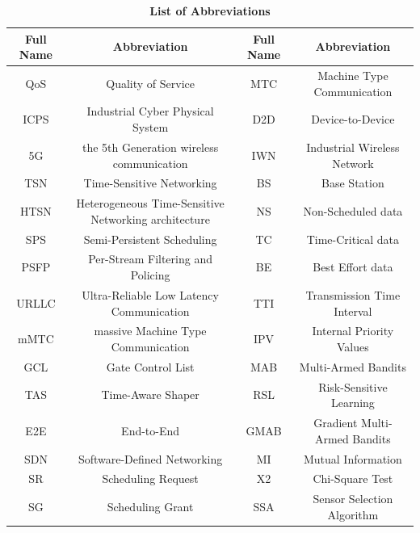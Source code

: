 \documentclass{SCIS2021}
\begin{document}
	\begin{table}[htbp]
		\footnotesize
		\captionsetup{labelformat=empty}
		\caption{{\color{blue}\textbf{List of Abbreviations}}}
		\label{tal:abbreviation}
		\label{tab0}
		\tabcolsep 8pt %
		\begin{tabular*}{\textwidth}{c|c|c|c}
			\toprule
			{\color{blue}\textbf{Full Name}} & {\color{blue}\textbf{Abbreviation}} & {\color{blue}\textbf{Full Name}} & {\color{blue}\textbf{Abbreviation}} \\\hline
			{\color{blue}QoS} & {\color{blue}Quality of Service} & {\color{blue}MTC} & {\color{blue}Machine Type Communication} \\
			{\color{blue}ICPS} & {\color{blue}Industrial Cyber Physical System} & {\color{blue}D2D} & {\color{blue}Device-to-Device} \\
			{\color{blue}5G} & {\color{blue}the 5th Generation wireless communication} & {\color{blue}IWN} & {\color{blue}Industrial Wireless Network}\\
			{\color{blue}TSN} & {\color{blue}Time-Sensitive Networking} & {\color{blue}BS} & {\color{blue}Base Station} \\
			{\color{blue}HTSN} & {\color{blue}Heterogeneous Time-Sensitive Networking architecture} & {\color{blue}NS} & {\color{blue}Non-Scheduled data} \\
			{\color{blue}SPS} & {\color{blue}Semi-Persistent Scheduling} & {\color{blue}TC} & {\color{blue}Time-Critical data} \\
			{\color{blue}PSFP} & {\color{blue}Per-Stream Filtering and Policing} & {\color{blue}BE} & {\color{blue}Best Effort data} \\
			{\color{blue}URLLC} & {\color{blue}Ultra-Reliable Low Latency Communication} & {\color{blue}TTI} & {\color{blue}Transmission Time Interval} \\
			{\color{blue}mMTC} & {\color{blue}massive Machine Type Communication} & {\color{blue}IPV} & {\color{blue}Internal Priority Values} \\
			{\color{blue}GCL} & {\color{blue}Gate Control List} & {\color{blue}MAB} & {\color{blue}Multi-Armed Bandits} \\
			{\color{blue}TAS} & {\color{blue}Time-Aware Shaper} & {\color{blue}RSL} & {\color{blue}Risk-Sensitive Learning} \\
			{\color{blue}E2E} & {\color{blue}End-to-End} & {\color{blue}GMAB} & {\color{blue}Gradient Multi-Armed Bandits} \\
			{\color{blue}SDN} & {\color{blue}Software-Defined Networking} & {\color{blue}MI} & {\color{blue}Mutual Information} \\
			{\color{blue}SR} & {\color{blue}Scheduling Request} & {\color{blue}X2} & {\color{blue}Chi-Square Test} \\
			{\color{blue}SG} & {\color{blue}Scheduling Grant} & {\color{blue}SSA} & {\color{blue}Sensor Selection Algorithm} \\
			\bottomrule
		\end{tabular*}
	\end{table}
\end{document}
